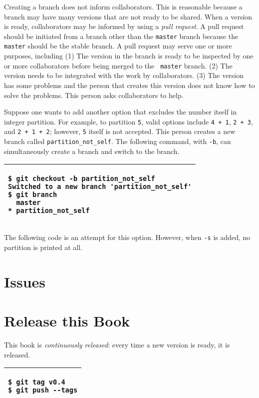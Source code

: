 Creating a branch does not inform collaborators. This is reasonable
because a branch may have many versions that are not ready to be
shared. When a version is ready, collaborators may be informed by
using a {\it pull request}. A pull request should be initiated from a
branch other than the {\tt master} branch because the {\tt master}
should be the stable branch. A pull request may serve one or more
purposes, including (1) The version in the branch is ready to be
inspected by one or more collaborators before being merged to the {\tt
  master} branch. (2) The version needs to be integrated with the work
by collaborators. (3) The version has some problems and the person
that creates this version does not know how to solve the
problems. This person asks collaborators to help.

Suppose one wants to add another option that excludes the number itself in
integer partition. For example, to partition {\tt 5}, valid options include
{\tt 4 + 1}, {\tt 2 + 3}, and {\tt 2 + 1 + 2}; however, {\tt 5} itself is not accepted.
This person creates a new branch called {\tt partition\_not\_self}. 
The following command, with {\tt -b}, can simultaneously create a branch and switch to the
branch.

\vspace{0.2in}
\noindent
\begin{tabular}{|p{5in}|}\hline
\begin{verbatim}
$ git checkout -b partition_not_self
Switched to a new branch 'partition_not_self'
$ git branch
  master
* partition_not_self
\end{verbatim}
\\ \hline
\end{tabular}
\vspace{0.2in}

The following code is an attempt for this option. However,
when {\tt -s} is added, no partition is printed at all.

\resetlinenumber[1]
\linenumbers
\begin{tt}
  
\end{tt}
\nolinenumbers


\section{Issues}

\section{Release this Book}

This book is {\it continuously released}: every time
a new version is ready, it is released.

\vspace{0.2in}
\noindent
\begin{tabular}{|p{5.5in}|}\hline
\begin{verbatim}
$ git tag v0.4
$ git push --tags
\end{verbatim}
\\ \hline
\end{tabular}
\vspace{0.2in}
